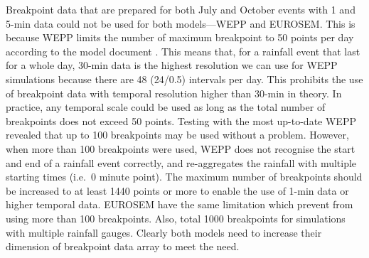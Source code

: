 Breakpoint data that are prepared for both July and October events with 1 and
5-min data could not be used for both models---WEPP and EUROSEM. This is because
WEPP limits the number of maximum breakpoint to 50 points per day according to
the model document \citep{flanagan1995-usda}. This means that, for a rainfall
event that last for a whole day, 30-min data is the highest resolution we can
use for WEPP simulations because there are 48 (24/0.5) intervals per day. This
prohibits the use of breakpoint data with temporal resolution higher than
30-min in theory. In practice, any temporal scale could be used as long as the
total number of breakpoints does not exceed 50 points. Testing with the most
up-to-date WEPP revealed that up to 100 breakpoints may be used without a
problem. However, when more than 100 breakpoints were used, WEPP does not
recognise the start and end of a rainfall event correctly, and re-aggregates the
rainfall with multiple starting times (i.e.\ 0 minute point). The maximum number
of breakpoints should be increased to at least 1440 points or more to enable
the use of 1-min data or higher temporal data. EUROSEM have the same limitation
which prevent from using more than 100 breakpoints. Also, total 1000 breakpoints
for simulations with multiple rainfall gauges. Clearly both models need to
increase their dimension of breakpoint data array to meet the need.

